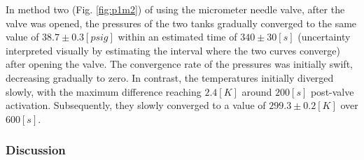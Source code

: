 \documentclass[12pt]{article}
\begin{document}
In method two (Fig. \ref{fig:p1m2}) of using the micrometer needle valve, after the valve was opened, the pressures of the two tanks gradually converged to the same value of $38.7\pm0.3[psig]$ within an estimated time of $340\pm30[s]$ (uncertainty interpreted visually by estimating the interval where the two curves converge) after opening the valve. The convergence rate of the pressures was initially swift, decreasing gradually to zero. In contrast, the temperatures initially diverged slowly, with the maximum difference reaching $2.4[K]$ around $200[s]$ post-valve activation. Subsequently, they slowly converged to a value of $299.3\pm0.2[K]$ over $600[s]$.

\subsubsection*{Discussion}
\end{document}
